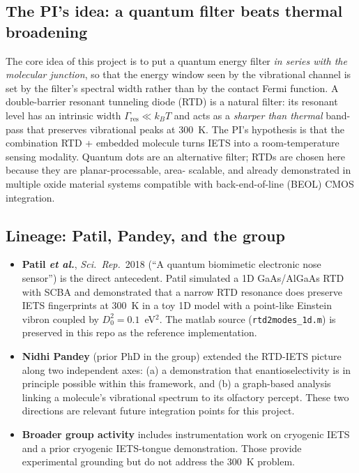 \documentclass[11pt,a4paper,onecolumn]{article}
\newcommand{\code}[1]{\texttt{\small #1}}
\begin{document}
\subsection{The PI's idea: a quantum filter beats thermal broadening}
The core idea of this project is to put a quantum energy filter
\emph{in series with the molecular junction}, so that the energy window
seen by the vibrational channel is set by the filter's spectral width
rather than by the contact Fermi function. A double-barrier resonant
tunneling diode (RTD) is a natural filter: its resonant level has an
intrinsic width
$\Gamma_{\mathrm{res}} \!\ll\! k_BT$ and acts as a \emph{sharper than
thermal} band-pass that preserves vibrational peaks at 300~K. The PI's
hypothesis is that the combination RTD + embedded molecule turns IETS into
a room-temperature sensing modality. Quantum dots are an alternative
filter; RTDs are chosen here because they are planar-processable, area-
scalable, and already demonstrated in multiple oxide material systems
compatible with back-end-of-line (BEOL) CMOS integration.

\subsection{Lineage: Patil, Pandey, and the group}
\begin{itemize}[leftmargin=1.3em]
\item \textbf{Patil \textit{et al.}}, \textit{Sci.\ Rep.}~2018 (``A quantum
biomimetic electronic nose sensor'') is the direct antecedent. Patil
simulated a 1D GaAs/AlGaAs RTD with SCBA and demonstrated that a narrow
RTD resonance does preserve IETS fingerprints at 300~K in a toy 1D model
with a point-like Einstein vibron coupled by $D_0^2 = 0.1$~eV$^2$. The
matlab source (\code{rtd2modes\_1d.m}) is preserved in this repo as the
reference implementation.
\item \textbf{Nidhi Pandey} (prior PhD in the group) extended the RTD-IETS
picture along two independent axes: (a) a demonstration that
enantioselectivity is in principle possible within this framework, and
(b) a graph-based analysis linking a molecule's vibrational spectrum to
its olfactory percept. These two directions are relevant future
integration points for this project.
\item \textbf{Broader group activity} includes instrumentation work on
cryogenic IETS and a prior cryogenic IETS-tongue demonstration. Those
provide experimental grounding but do not address the 300~K problem.
\end{itemize}
\end{document}
